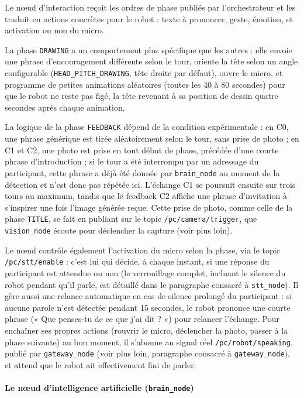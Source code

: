 \documentclass[11pt]{article}
\begin{document}
Le nœud d'interaction reçoit les ordres de phase publiés par l'orchestrateur et les traduit en actions concrètes pour le robot : texte à prononcer, geste, émotion, et activation ou non du micro.

La phase \texttt{DRAWING} a un comportement plus spécifique que les autres : elle envoie une phrase d'encouragement différente selon le tour, oriente la tête selon un angle configurable (\texttt{HEAD\_PITCH\_DRAWING}, tête droite par défaut), ouvre le micro, et programme de petites animations aléatoires (toutes les 40 à 80 secondes) pour que le robot ne reste pas figé, la tête revenant à sa position de dessin quatre secondes après chaque animation.

La logique de la phase \texttt{FEEDBACK} dépend de la condition expérimentale : en C0, une phrase générique est tirée aléatoirement selon le tour, sans prise de photo ; en C1 et C2, une photo est prise en tout début de phase, précédée d'une courte phrase d'introduction ; si le tour a été interrompu par un adressage du participant, cette phrase a déjà été donnée par \texttt{brain\_node} au moment de la détection et n'est donc pas répétée ici. L'échange C1 se poursuit ensuite sur trois tours au maximum, tandis que le feedback C2 affiche une phrase d'invitation à s'inspirer une fois l'image générée reçue. Cette prise de photo, comme celle de la phase \texttt{TITLE}, se fait en publiant sur le topic \texttt{/pc/camera/trigger}, que \texttt{vision\_node} écoute pour déclencher la capture (voir plus loin). 

Le nœud contrôle également l'activation du micro selon la phase, via le topic \texttt{/pc/stt/enable} : c'est lui qui décide, à chaque instant, si une réponse du participant est attendue ou non (le verrouillage complet, incluant le silence du robot pendant qu'il parle, est détaillé dans le paragraphe consacré à \texttt{stt\_node}). Il gère aussi une relance automatique en cas de silence prolongé du participant : si aucune parole n'est détectée pendant 15 secondes, le robot prononce une courte phrase (« Que penses-tu de ce que j'ai dit ? ») pour relancer l'échange. Pour enchaîner ses propres actions (rouvrir le micro, déclencher la photo, passer à la phase suivante) au bon moment, il s'abonne au signal réel \texttt{/pc/robot/speaking}, publié par \texttt{gateway\_node} (voir plus loin, paragraphe consacré à \texttt{gateway\_node}), et attend que le robot ait effectivement fini de parler.

\paragraph{Le nœud d'intelligence artificielle (\texttt{brain\_node})}
\label{sec:brain_node}
\end{document}

